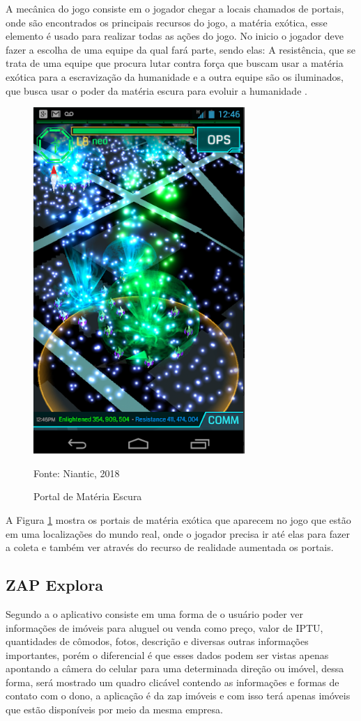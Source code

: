 	A mecânica do jogo consiste em o jogador chegar a locais chamados de portais, onde são encontrados os principais recursos do jogo, a matéria exótica, esse elemento é usado para realizar todas as ações do jogo. No inicio o jogador deve fazer a escolha de uma equipe da qual fará parte, sendo elas: A resistência, que se trata de uma equipe que procura lutar contra força que buscam usar a matéria exótica para a escravização da humanidade e a outra equipe são os iluminados, que busca usar o poder da matéria escura para evoluir a humanidade \cite{sobke:2017}.
	
	\begin{figure}[H]
		\centering
		\includegraphics[scale=0.6]{imagens/ingress}
		\caption{Portal de Matéria Escura}
		Fonte: Niantic, 2018
		\label{fig:ingress}
	\end{figure}
	
	A Figura \ref{fig:ingress} mostra os portais de matéria exótica que aparecem no jogo que estão em uma localizações do mundo real, onde o jogador precisa ir até elas para fazer a coleta e também ver através do recurso de realidade aumentada os portais.
	
	\subsection{ZAP Explora}
	Segundo a  o aplicativo consiste em uma forma de o usuário poder ver informações de imóveis para aluguel ou venda como preço, valor de IPTU, quantidades de cômodos, fotos, descrição e diversas outras informações importantes, porém o diferencial é que esses dados podem ser vistas apenas apontando a câmera do celular para uma determinada direção ou imóvel, dessa forma, será mostrado um quadro clicável contendo as informações e formas de contato com o dono, a aplicação é da zap imóveis e com isso terá apenas imóveis que estão disponíveis por meio da mesma empresa.
	
